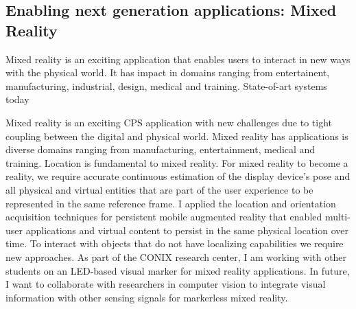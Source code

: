 \documentclass[10pt]{article}
\begin{document}

\subsection{Enabling next generation applications: Mixed Reality}
Mixed reality is an exciting application that enables users to interact in new ways with the physical world. It has impact in domains ranging from entertainent, manufacturing, industrial, design, medical and training. State-of-art systems today 

Mixed reality is an exciting CPS application with new challenges due to tight coupling between the digital and physical world. Mixed reality has applications is diverse domains ranging from manufacturing, entertainment, medical and training. Location is fundamental to mixed reality. For mixed reality to become a reality, we require accurate continuous estimation of the display device's pose and all physical and virtual entities that are part of the user experience to be represented in the same reference frame. I applied the location and orientation acquisition techniques for persistent mobile augmented reality that enabled multi-user applications and virtual content to persist in the same physical location over time. To interact with objects that do not have localizing capabilities we require new approaches. As part of the CONIX research center, I am working with other students on an LED-based visual marker for mixed reality applications. In future, I want to collaborate with researchers in computer vision to integrate visual information with other sensing signals for markerless mixed reality. 




\end{document}
